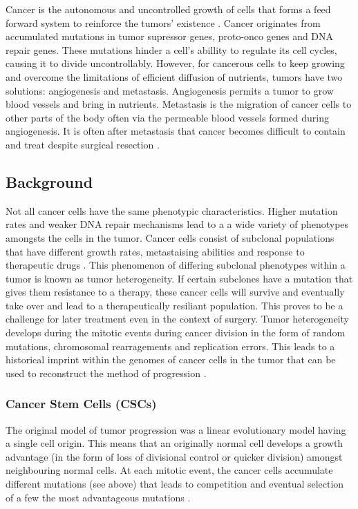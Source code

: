 \documentclass[12pt]{article}
\begin{document}
Cancer is the autonomous and uncontrolled growth of cells that forms a feed forward system to reinforce the tumors’ existence \cite{hallmarks}. Cancer originates from accumulated mutations in tumor supressor genes, proto-onco genes and DNA repair genes. These mutations hinder a cell's abillity to regulate its cell cycles, causing it to divide uncontrollably. However, for cancerous cells to keep growing and overcome the limitations of efficient diffusion of nutrients, tumors have two solutions: angiogenesis and metastasis. Angiogenesis permits a tumor to grow blood vessels and bring in nutrients. Metastasis is the migration of cancer cells to other parts of the body often via the permeable blood vessels formed during angiogenesis. It is often after metastasis that cancer becomes difficult to contain and treat despite surgical resection \cite{Demicheli2008}.

\subsection{Background}
Not all cancer cells have the same phenotypic characteristics. Higher mutation rates and weaker DNA repair mechanisms lead to a a wide variety of phenotypes amongsts the cells in the tumor. Cancer cells consist of subclonal populations that have different growth rates, metastaising abilities and response to therapeutic drugs \cite{Heppner1983}. This phenomenon of differing subclonal phenotypes within a tumor is known as tumor heterogeneity. If certain subclones have a mutation that gives them resistance to a therapy, these cancer cells will survive and eventually take over and lead to a therapeutically resiliant population. This proves to be a challenge for later treatment even in the context of surgery. Tumor heterogeneity develops during the mitotic events during cancer division in the form of random mutations, chromosomal rearragements and replication errors. This leads to a historical imprint within the genomes of cancer cells in the tumor that can be used to reconstruct the method of progression \cite{Naxerova2015}. 

\subsubsection{Cancer Stem Cells (CSCs)}
The original model of tumor progression was a linear evolutionary model having a single cell origin. This means that an originally normal cell develops a growth advantage (in the form of loss of divisional control or quicker division) amongst neighbouring normal cells. At each mitotic event, the cancer cells accumulate different mutations (see above) that leads to competition and eventual selection of a few the most advantageous mutations \cite{Nowell}. 
\end{document}

